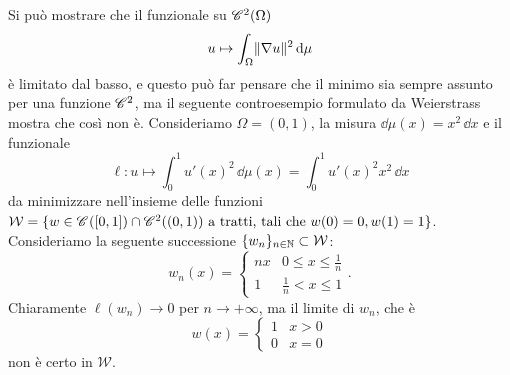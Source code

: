 Si può mostrare che il funzionale su $\cont[2]{\Omega}$
\begin{equation}
    u\mapsto \int_\Omega\norm{\grad u}^2\,\dd\mu
\end{equation}
è limitato dal basso, e questo può far pensare che il minimo sia sempre assunto per una funzione $\cclass[2]$, ma il seguente controesempio formulato da Weierstrass mostra che cos\`i non è.
Consideriamo $\Omega=(0,1)$, la misura $\dd\mu(x)=x^2\,\dd x$ e il funzionale
\begin{equation}
    \ell\colon u\mapsto \int_0^1 u'(x)^2\,\dd\mu(x)=\int_0^1u'(x)^2 x^2\,\dd x
    \label{eq:controesempio-weierstrass-dirichlet}
\end{equation}
da minimizzare nell'insieme delle funzioni $\mathcal{W}=\{w\in\cont{[0,1]}\cap\cont[2]{(0,1)}\text{ a tratti, tali che }w(0)=0, w(1)=1\}$.
Consideriamo la seguente successione $\{w_n\}_{n\in\N}\subset\mathcal{W}$:
\begin{equation}
    w_n(x)=
    \begin{cases}
        nx & 0\le x\le\frac1{n}\\
        1  & \frac1{n}< x\le 1
    \end{cases}.
\end{equation}
Chiaramente $\ell(w_n)\to 0$ per $n\to+\infty$, ma il limite di $w_n$, che è
\begin{equation}
    w(x)=
    \begin{cases}
        1 & x>0\\
        0 & x=0
    \end{cases}
\end{equation}
non è certo in $\mathcal{W}$.

